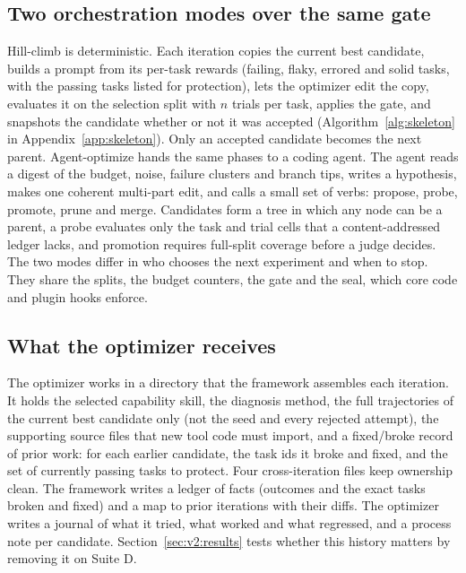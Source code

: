 \subsection{Two orchestration modes over the same gate}
\label{sec:v2:modes}

Hill-climb is deterministic. Each iteration copies the current best candidate, builds a prompt from its per-task rewards (failing, flaky, errored and solid tasks, with the passing tasks listed for protection), lets the optimizer edit the copy, evaluates it on the selection split with $n$ trials per task, applies the gate, and snapshots the candidate whether or not it was accepted (Algorithm~\ref{alg:skeleton} in Appendix~\ref{app:skeleton}). Only an accepted candidate becomes the next parent. Agent-optimize hands the same phases to a coding agent. The agent reads a digest of the budget, noise, failure clusters and branch tips, writes a hypothesis, makes one coherent multi-part edit, and calls a small set of verbs: propose, probe, promote, prune and merge. Candidates form a tree in which any node can be a parent, a probe evaluates only the task and trial cells that a content-addressed ledger lacks, and promotion requires full-split coverage before a judge decides. The two modes differ in who chooses the next experiment and when to stop. They share the splits, the budget counters, the gate and the seal, which core code and plugin hooks enforce.

\subsection{What the optimizer receives}
\label{sec:v2:context}

The optimizer works in a directory that the framework assembles each iteration. It holds the selected capability skill, the diagnosis method, the full trajectories of the current best candidate only (not the seed and every rejected attempt), the supporting source files that new tool code must import, and a fixed/broke record of prior work: for each earlier candidate, the task ids it broke and fixed, and the set of currently passing tasks to protect. Four cross-iteration files keep ownership clean. The framework writes a ledger of facts (outcomes and the exact tasks broken and fixed) and a map to prior iterations with their diffs. The optimizer writes a journal of what it tried, what worked and what regressed, and a process note per candidate. Section~\ref{sec:v2:results} tests whether this history matters by removing it on Suite D. 
